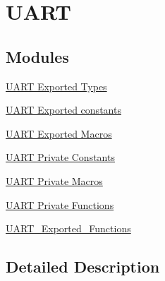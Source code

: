 \hypertarget{group___u_a_r_t}{}\section{U\+A\+RT}
\label{group___u_a_r_t}
\subsection*{Modules}
\begin{DoxyCompactItemize}
\item 
\hyperlink{group___u_a_r_t___exported___types}{U\+A\+R\+T Exported Types}
\item 
\hyperlink{group___u_a_r_t___exported___constants}{U\+A\+R\+T Exported constants}
\item 
\hyperlink{group___u_a_r_t___exported___macros}{U\+A\+R\+T Exported Macros}
\item 
\hyperlink{group___u_a_r_t___private___constants}{U\+A\+R\+T Private Constants}
\item 
\hyperlink{group___u_a_r_t___private___macros}{U\+A\+R\+T Private Macros}
\item 
\hyperlink{group___u_a_r_t___private___functions}{U\+A\+R\+T Private Functions}
\item 
\hyperlink{group___u_a_r_t___exported___functions}{U\+A\+R\+T\+\_\+\+Exported\+\_\+\+Functions}
\end{DoxyCompactItemize}


\subsection{Detailed Description}
